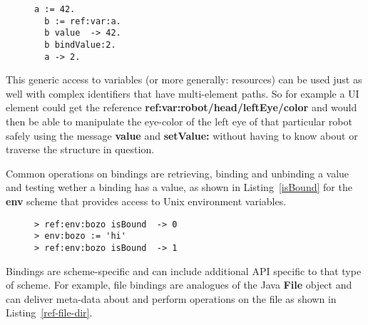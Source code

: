 \documentclass[preprint,authoryear]{acm_proc_article-sp}
\begin{document}
\begin{figure}[htbp]
\begin{lstlisting}[style=L,label=ref-binding,caption=Accessing a variable via its binding.]
  a := 42.
  b := ref:var:a.
  b value  -> 42.
  b bindValue:2.
  a -> 2.
\end{lstlisting}
\end{figure}

This generic access to variables (or more generally: resources) can be used just as well
with complex identifiers that have multi-element paths.  So for example a UI element
could get the reference {\bf ref:var:robot/head/leftEye/color} and would then be
able to manipulate the eye-color of the left eye of that particular robot safely using
the message {\bf value} and {\bf setValue:}
without having to know about or traverse the structure in question.

Common operations on bindings are retrieving, binding and unbinding a value and testing 
wether a binding has a value, as shown in Listing~\ref{isBound} for the {\bf env} scheme
that provides access to Unix environment variables.


\begin{figure}[htbp]
\begin{lstlisting}[style=L,label=isBound,caption=Is environment variable set?]
> ref:env:bozo isBound  -> 0
> env:bozo := 'hi'
> ref:env:bozo isBound  -> 1
\end{lstlisting}
\end{figure}

Bindings are scheme-specific and can include additional API specific to that type of scheme.
For example, file bindings are analogues of the Java {\bf File} object and can deliver
meta-data about and perform operations on the file as shown in Listing~\ref{ref-file-dir}.

\end{document}
